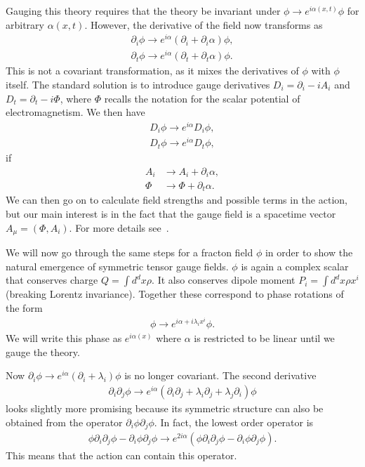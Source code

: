 \documentclass[a4paper,12pt]{article}
\newcommand{\nn}{\nonumber\\}
\begin{document}
Gauging this theory requires that the theory be invariant under $\phi\to e^{i\alpha(x,t)}\phi$ for arbitrary $\alpha(x,t)$. However, the derivative of the field now transforms as 
\begin{align}
\partial_i\phi\to e^{i\alpha}\left(\partial_i+\partial_i\alpha\right)\phi,\nn
\partial_t\phi\to e^{i\alpha}\left(\partial_t+\partial_t\alpha\right)\phi.
	\label{eqn:nconv}
\end{align}
This is not a covariant transformation, as it mixes the derivatives of $\phi$ with $\phi$ itself. The standard solution is to introduce gauge derivatives $D_i=\partial_i-iA_i$ and $D_t=\partial_t-i\Phi$, where $\Phi$ recalls the notation for the scalar potential of electromagnetism. We then have 
\begin{align}
D_i\phi\to e^{i\alpha}D_i\phi,\nn
D_t\phi\to e^{i\alpha}D_t\phi,
\end{align}
if 
\begin{align}
A_i &\to A_i+\partial_i\alpha, \nn
\Phi&\to\Phi+\partial_t\alpha.
\end{align}
We can then go on to calculate field strengths and possible terms in the action, but our main interest is in the fact that the gauge field is a spacetime vector $A_\mu=(\Phi,A_i)$. For more details see~\cite{PretkoFractonGauge}.

We will now go through the same steps for a fracton field $\phi$ in order to show the natural emergence of symmetric tensor gauge fields. $\phi$ is again a complex scalar that conserves charge $Q=\int d^dx\rho$. It also conserves dipole moment $P_i = \int d^dx\rho x^i$ (breaking Lorentz invariance). Together these correspond to phase rotations of the form 
\begin{align}
\phi\to e^{i\alpha+i\lambda_ix^i}\phi.
\end{align}
We will write this phase as $e^{i\alpha(x)}$ where $\alpha$ is restricted to be linear until we gauge the theory.

Now $\partial_i\phi\to e^{i\alpha}(\partial_i+\lambda_i)\phi$ is no longer covariant. The second derivative 
\begin{align}
\partial_i\partial_j\phi\to e^{i\alpha}(\partial_i\partial_j+\lambda_i\partial_j+\lambda_j\partial_i)\phi
\end{align}
looks slightly more promising because its symmetric structure can also be obtained from the operator $\partial_i\phi\partial_j\phi$. In fact, the lowest order operator is~\cite{PretkoFractonGauge}
\begin{align}
\phi\partial_i\partial_j\phi-\partial_i\phi\partial_j\phi \to e^{2i\alpha} \left(\phi\partial_i\partial_j\phi-\partial_i\phi\partial_j\phi\right).
\end{align}
This means that the action can contain this operator.
\end{document}
